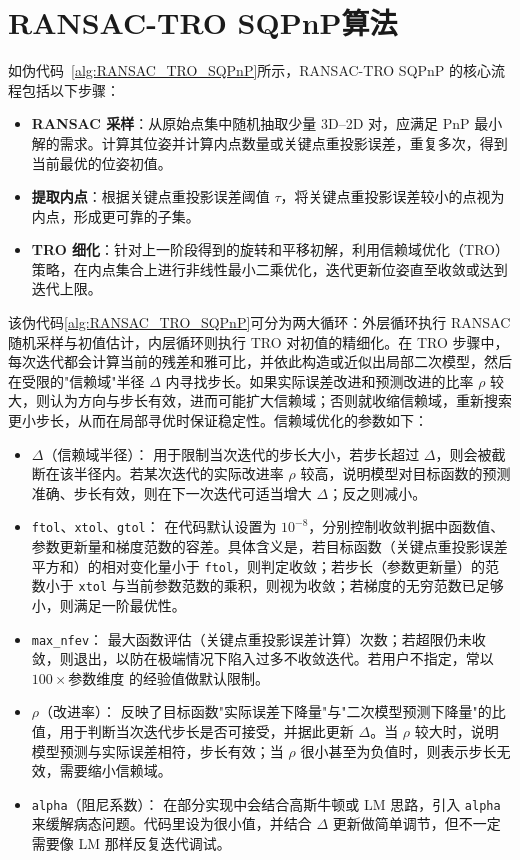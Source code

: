 \section{RANSAC-TRO SQPnP算法}
\label{sec:RANSAC-TRO-SQPnP:Algorithm}

如伪代码~\ref{alg:RANSAC_TRO_SQPnP}所示，RANSAC-TRO SQPnP 的核心流程包括以下步骤：
\begin{itemize}
	\item \textbf{RANSAC 采样}：从原始点集中随机抽取少量 3D--2D 对，应满足 PnP 最小解的需求。计算其位姿并计算内点数量或关键点重投影误差，重复多次，得到当前最优的位姿初值。
	\item \textbf{提取内点}：根据关键点重投影误差阈值 $\tau$，将关键点重投影误差较小的点视为内点，形成更可靠的子集。
	\item \textbf{TRO 细化}：针对上一阶段得到的旋转和平移初解，利用信赖域优化（TRO）策略，在内点集合上进行非线性最小二乘优化，迭代更新位姿直至收敛或达到迭代上限。
\end{itemize}

该伪代码\autoref{alg:RANSAC_TRO_SQPnP}可分为两大循环：外层循环执行 RANSAC 随机采样与初值估计，内层循环则执行 TRO 对初值的精细化。在 TRO 步骤中，每次迭代都会计算当前的残差和雅可比，并依此构造或近似出局部二次模型，然后在受限的"信赖域"半径 $\Delta$ 内寻找步长。如果实际误差改进和预测改进的比率 $\rho$ 较大，则认为方向与步长有效，进而可能扩大信赖域；否则就收缩信赖域，重新搜索更小步长，从而在局部寻优时保证稳定性。信赖域优化的参数如下：
\begin{itemize}
	\item \textbf{$\Delta$}（信赖域半径）：
	用于限制当次迭代的步长大小，若步长超过 $\Delta$，则会被截断在该半径内。若某次迭代的实际改进率 $\rho$ 较高，说明模型对目标函数的预测准确、步长有效，则在下一次迭代可适当增大 $\Delta$；反之则减小。
	
	\item {\texttt{ftol}、\texttt{xtol}、\texttt{gtol}}：
	在代码默认设置为 $10^{-8}$，分别控制收敛判据中函数值、参数更新量和梯度范数的容差。具体含义是，若目标函数（关键点重投影误差平方和）的相对变化量小于 \texttt{ftol}，则判定收敛；若步长（参数更新量）的范数小于 \texttt{xtol} 与当前参数范数的乘积，则视为收敛；若梯度的无穷范数已足够小，则满足一阶最优性。
	
	\item \texttt{max\_nfev}：
	最大函数评估（关键点重投影误差计算）次数；若超限仍未收敛，则退出，以防在极端情况下陷入过多不收敛迭代。若用户不指定，常以 $100\times\text{参数维度}$ 的经验值做默认限制。
	
	\item $\rho$（改进率）：
	反映了目标函数"实际误差下降量"与"二次模型预测下降量"的比值，用于判断当次迭代步长是否可接受，并据此更新 $\Delta$。当 $\rho$ 较大时，说明模型预测与实际误差相符，步长有效；当 $\rho$ 很小甚至为负值时，则表示步长无效，需要缩小信赖域。
	
	\item \texttt{alpha}（阻尼系数）：
	在部分实现中会结合高斯牛顿或 LM 思路，引入 \texttt{alpha} 来缓解病态问题。代码里设为很小值，并结合 $\Delta$ 更新做简单调节，但不一定需要像 LM 那样反复迭代调试。
\end{itemize}

